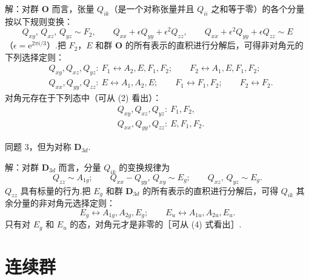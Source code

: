 \begin{xiti}
解：对群 $\boldsymbol{O}$ 而言，张量 $Q_{ik}$（是一个对称张量并且 $Q_{ii}$ 之和等于零）的各个分量按以下规则变换：
\begin{equation*}
  Q_{xy},\,Q_{xz},\,Q_{yz}\sim F_2,\qquad
  Q_{xx}+\epsilon Q_{yy}+\epsilon^2 Q_{zz},\qquad
  Q_{xx}+\epsilon^2 Q_{yy}+\epsilon Q_{zz}\sim E
\end{equation*}
（$\epsilon=\mathrm{e}^{2\pi i/3}$）.把 $F_2$，$E$ 和群 $\boldsymbol{O}$ 的所有表示的直积进行分解后，可得非对角元的下列选择定则：
\begin{equation*}
\begin{aligned}
  &Q_{xy},Q_{xz},Q_{yz}:\ F_1\leftrightarrow A_2,E,F_1,F_2;\qquad
   F_2\leftrightarrow A_1,E,F_1,F_2;\\
  &Q_{xx},Q_{yy},Q_{zz}:\ E\leftrightarrow A_1,A_2,E;\qquad
   F_1\leftrightarrow F_1,F_2;\qquad F_2\leftrightarrow F_2.
\end{aligned}
\end{equation*}
对角元存在于下列态中（可从 (2) 看出）：
\begin{equation*}
\begin{aligned}
  &Q_{xy},Q_{xz},Q_{yz}:\ F_1,F_2,\\
  &Q_{xx},Q_{yy},Q_{zz}:\ E,F_1,F_2.
\end{aligned}
\end{equation*}

\quad 同题 3，但为对称 $\boldsymbol{D}_{3d}$.

解：对群 $\boldsymbol{D}_{3d}$ 而言，分量 $Q_{ik}$ 的变换规律为
\begin{equation*}
  Q_{zz}\sim A_{1g};\qquad
  Q_{xx}-Q_{yy},\,Q_{xy}\sim E_g;\qquad
  Q_{xz},\,Q_{yz}\sim E_g.
\end{equation*}
$Q_{zz}$ 具有标量的行为.把 $E_g$ 和群 $\boldsymbol{D}_{3d}$ 的所有表示的直积进行分解后，可得 $Q_{ik}$ 其余分量的非对角元选择定则：
\begin{equation*}
  E_g\leftrightarrow A_{1g},A_{2g},E_g;\qquad
  E_u\leftrightarrow A_{1u},A_{2u},E_u.
\end{equation*}
只有对 $E_g$ 和 $E_u$ 的态，对角元才是非零的［可从 (4) 式看出］.

\renewcommand{\theequation}{\arabic{section}.\arabic{equation}}%

\end{xiti}

\section{连续群}

